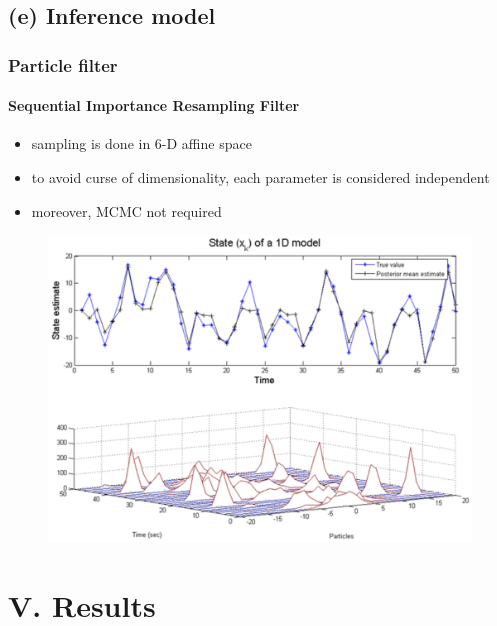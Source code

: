 \subsection{(e) Inference model}
\begin{frame}
\frametitle{Particle filter}
\framesubtitle{Sequential Importance Resampling Filter}
\logoCSIPCPL\mypagenum
\begin{itemize}
\item sampling is done in 6-D affine space
\item to avoid curse of dimensionality, each parameter is considered independent
\item moreover, MCMC not required
\end{itemize}
\begin{figure}
\includegraphics[width=1.0\textwidth]{thesis/TRK_ParticleFilter_multimodalPDF.pdf}
\end{figure}	
\end{frame}







\section{V. Results}

